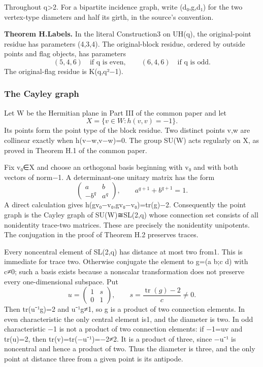 Throughout q\textgreater2. For a bipartite incidence graph, write
(d₀,g,d₁) for the two vertex-type diameters and half its girth, in the
source's convention.

\textbf{Theorem H.Labels.} In the literal Construction3 on UH(q), the
original-point residue has parameters (4,3,4). The original-block
residue, ordered by outside points and flag objects, has parameters \[
(5,4,6)\quad\text{if q is even},\qquad
(6,4,6)\quad\text{if q is odd}.
\tag{H1}
\] The original-flag residue is K(q,q²−1).

\subsubsection{The Cayley graph}\label{the-cayley-graph}

Let W be the Hermitian plane in Part III of the common paper and let \[
X=\{v\in W:h(v,v)=-1\}.
\] Its points form the point type of the block residue. Two distinct
points v,w are collinear exactly when h(v−w,v−w)=0. The group SU(W) acts
regularly on X, as proved in Theorem H.1 of the common paper.

Fix v₀∈X and choose an orthogonal basis beginning with v₀ and with both
vectors of norm−1. A determinant-one unitary matrix has the form \[
\begin{pmatrix}a&b\\-b^q&a^q\end{pmatrix},
\qquad a^{q+1}+b^{q+1}=1.
\] A direct calculation gives h(gv₀−v₀,gv₀−v₀)=tr(g)−2. Consequently the
point graph is the Cayley graph of SU(W)≅SL(2,q) whose connection set
consists of all nonidentity trace-two matrices. These are precisely the
nonidentity unipotents. The conjugation in the proof of Theorem H.2
preserves traces.

Every noncentral element of SL(2,q) has distance at most two from1. This
is immediate for trace two. Otherwise conjugate the element to g=(a b;c
d) with c≠0; such a basis exists because a nonscalar transformation does
not preserve every one-dimensional subspace. Put \[
u=\begin{pmatrix}1&s\\0&1\end{pmatrix},
\qquad s=\frac{\operatorname{tr}(g)-2}{c}\ne0.
\] Then tr(u⁻¹g)=2 and u⁻¹g≠1, so g is a product of two connection
elements. In even characteristic the only central element is1, and the
diameter is two. In odd characteristic −1 is not a product of two
connection elements: if −1=uv and tr(u)=2, then tr(v)=tr(−u⁻¹)=−2≠2. It
is a product of three, since −u⁻¹ is noncentral and hence a product of
two. Thus the diameter is three, and the only point at distance three
from a given point is its antipode.

